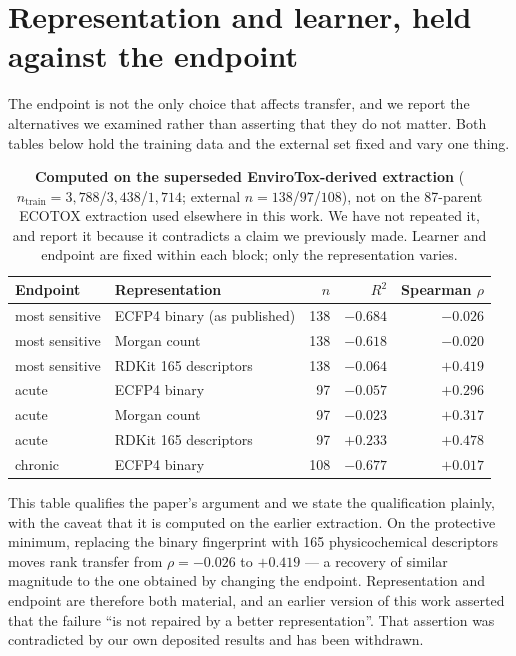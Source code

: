 \documentclass[11pt]{article}
\begin{document}
\section{Representation and learner, held against the endpoint}

The endpoint is not the only choice that affects transfer, and we report the
alternatives we examined rather than asserting that they do not matter. Both
tables below hold the training data and the external set fixed and vary one
thing.

\begin{table}[h]
\centering
\caption{\textbf{Computed on the superseded EnviroTox-derived extraction}
($n_{\mathrm{train}}=3{,}788$/$3{,}438$/$1{,}714$; external $n=138$/$97$/$108$),
not on the 87-parent ECOTOX extraction used elsewhere in this work. We have not
repeated it, and report it because it contradicts a claim we previously made.
Learner and endpoint are fixed within each block; only the representation varies.}
\small
\begin{tabular}{llrrr}
\toprule
Endpoint & Representation & $n$ & $R^2$ & Spearman $\rho$ \\
\midrule
most sensitive & ECFP4 binary (as published) & 138 & $-0.684$ & $-0.026$ \\
most sensitive & Morgan count & 138 & $-0.618$ & $-0.020$ \\
most sensitive & RDKit 165 descriptors & 138 & $-0.064$ & $+0.419$ \\
\midrule
acute & ECFP4 binary & 97 & $-0.057$ & $+0.296$ \\
acute & Morgan count & 97 & $-0.023$ & $+0.317$ \\
acute & RDKit 165 descriptors & 97 & $+0.233$ & $+0.478$ \\
\midrule
chronic & ECFP4 binary & 108 & $-0.677$ & $+0.017$ \\
\bottomrule
\end{tabular}
\end{table}

This table qualifies the paper's argument and we state the qualification
plainly, with the caveat that it is computed on the earlier extraction. On the
protective minimum, replacing the binary fingerprint with 165
physicochemical descriptors moves rank transfer from $\rho=-0.026$ to $+0.419$
--- a recovery of similar magnitude to the one obtained by changing the
endpoint. Representation and endpoint are therefore both material, and an
earlier version of this work asserted that the failure ``is not repaired by a
better representation''. That assertion was contradicted by our own deposited
results and has been withdrawn.
\end{document}
